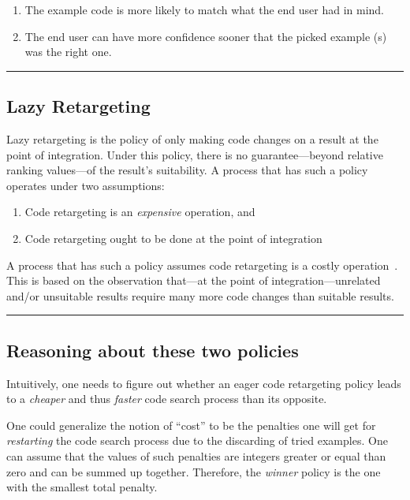 \begin{enumerate}
	\item The example code is more likely to match what the end user had in mind.
	\item The end user can have more confidence sooner that the picked example (s) was the right one.
\end{enumerate}


\fancybreak{\pfbreakdisplay}

\subsection{Lazy Retargeting}

Lazy retargeting is the policy of only making code changes on a result at the point of integration. Under this policy, there is no guarantee---beyond relative ranking values---of the result's suitability. A process that has such a policy operates under two assumptions:

\begin{enumerate}
	\item Code retargeting is an \emph{expensive} operation, and
	\item Code retargeting ought to be done at the point of integration
\end{enumerate}

A process that has such a policy assumes code retargeting is a costly operation~\cite{Brandt:2009ew, Wightman:2012gc}. This is based on the observation that---at the point of integration---unrelated and/or unsuitable results require many more code changes than suitable results.

\fancybreak{\pfbreakdisplay}

\subsection{Reasoning about these two policies}

Intuitively, one needs to figure out whether an eager code retargeting policy leads to a \emph{cheaper} and thus \emph{faster} code search process than its opposite. 

One could generalize the notion of ``cost'' to be the penalties one will get for \emph{restarting} the code search process due to the discarding of tried examples. One can assume that the values of such penalties are integers greater or equal than zero and can be summed up together. Therefore, the \emph{winner} policy is the one with the smallest total penalty.

